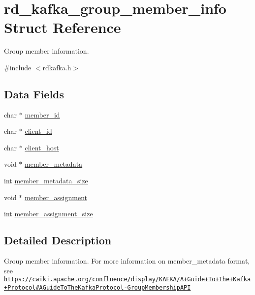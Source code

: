 \hypertarget{structrd__kafka__group__member__info}{
\section{rd\_\-kafka\_\-group\_\-member\_\-info Struct Reference}
\label{structrd__kafka__group__member__info}
}


Group member information.  


{\ttfamily \#include $<$rdkafka.h$>$}\subsection*{Data Fields}
\begin{DoxyCompactItemize}
\item 
char $\ast$ \hyperlink{structrd__kafka__group__member__info_a388fd408bd980bf3baeef7e3c0465d60}{member\_\-id}
\item 
char $\ast$ \hyperlink{structrd__kafka__group__member__info_afb8a67cd4ecce66c17f5c2c2b7b8bac8}{client\_\-id}
\item 
char $\ast$ \hyperlink{structrd__kafka__group__member__info_adaa6e3567a9baa4f97885de3c53f5ae1}{client\_\-host}
\item 
void $\ast$ \hyperlink{structrd__kafka__group__member__info_ac908871fe2c69611a4173773ab8abf2a}{member\_\-metadata}
\item 
int \hyperlink{structrd__kafka__group__member__info_a50b02ae32b364f42d8a5a1423fb08a14}{member\_\-metadata\_\-size}
\item 
void $\ast$ \hyperlink{structrd__kafka__group__member__info_ae8edf41f4c2781c106e5a8a703dae102}{member\_\-assignment}
\item 
int \hyperlink{structrd__kafka__group__member__info_a4fbe1d1084f1fe8113a575020e228412}{member\_\-assignment\_\-size}
\end{DoxyCompactItemize}


\subsection{Detailed Description}
Group member information. For more information on {\ttfamily member\_\-metadata} format, see \href{https://cwiki.apache.org/confluence/display/KAFKA/A+Guide+To+The+Kafka+Protocol#AGuideToTheKafkaProtocol-GroupMembershipAPI}{\tt https://cwiki.apache.org/confluence/display/KAFKA/A+Guide+To+The+Kafka+Protocol\#AGuideToTheKafkaProtocol-\/GroupMembershipAPI} 

